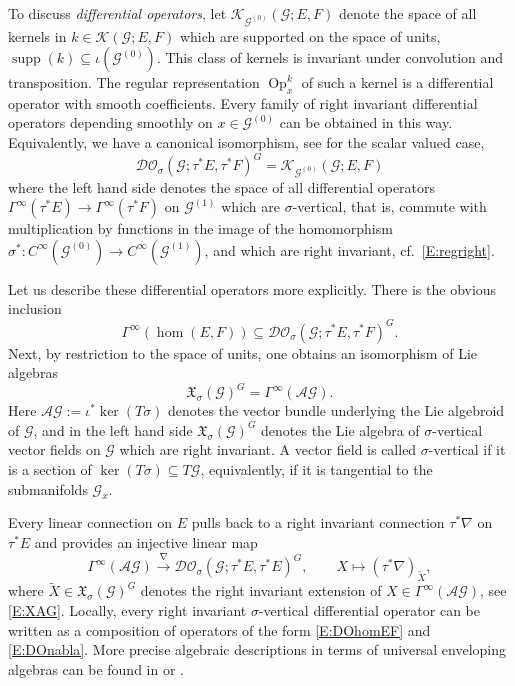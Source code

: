 \documentclass[reqno,12pt]{amsart}
\DeclareMathOperator{\Op}{Op}
\DeclareMathOperator{\supp}{supp}
\newcommand{\DO}{\mathcal D\mathcal O}
\theoremstyle{plain}
\theoremstyle{definition}
\begin{document}
To discuss \emph{differential operators}, let $\mathcal K_{\mathcal G^{(0)}}(\mathcal G;E,F)$ denote the space of all kernels in $k\in\mathcal K(\mathcal G;E,F)$ which are supported on the space of units, $\supp(k)\subseteq\iota(\mathcal G^{(0)})$.
This class of kernels is invariant under convolution and transposition.
The regular representation $\Op^k_x$ of such a kernel is a differential operator with smooth coefficients.
Every family of right invariant differential operators depending smoothly on $x\in\mathcal G^{(0)}$ can be obtained in this way.
Equivalently, we have a canonical isomorphism, see \cite[Proposition~84]{EY15} for the scalar valued case,
\begin{equation}\label{E:DOG}
\DO_\sigma(\mathcal G;\tau^*E,\tau^*F)^G
=\mathcal K_{\mathcal G^{(0)}}(\mathcal G;E,F)
\end{equation}
where the left hand side denotes the space of all differential operators $\Gamma^\infty(\tau^*E)\to\Gamma^\infty(\tau^*F)$ on $\mathcal G^{(1)}$ which are $\sigma$-vertical, that is, commute with multiplication by functions in the image of the homomorphism $\sigma^*\colon C^\infty(\mathcal G^{(0)})\to C^\infty(\mathcal G^{(1)})$, and which are right invariant, cf.~\eqref{E:regright}.


Let us describe these differential operators more explicitly. 
There is the obvious inclusion 
\begin{equation}\label{E:DOhomEF}
\Gamma^\infty(\hom(E,F))\subseteq\DO_\sigma(\mathcal G;\tau^*E,\tau^*F)^G.
\end{equation}
Next, by restriction to the space of units, one obtains an isomorphism of Lie algebras
\begin{equation}\label{E:XAG}
\mathfrak X_\sigma(\mathcal G)^G=\Gamma^\infty(\mathcal A\mathcal G).
\end{equation}
Here $\mathcal A\mathcal G:=\iota^*\ker(T\sigma)$ denotes the vector bundle underlying the Lie algebroid of $\mathcal G$, and in the left hand side  $\mathfrak X_\sigma(\mathcal G)^G$ denotes the Lie algebra of $\sigma$-vertical vector fields on $\mathcal G$ which are right invariant.
A vector field is called $\sigma$-vertical if it is a section of $\ker(T\sigma)\subseteq T\mathcal G$, equivalently, if it is tangential to the submanifolds $\mathcal G_x$.


Every linear connection on $E$ pulls back to a right invariant connection $\tau^*\nabla$ on $\tau^*E$ and provides an injective linear map
\begin{equation}\label{E:DOnabla}
\Gamma^\infty(\mathcal A\mathcal G)\xrightarrow\nabla\DO_\sigma(\mathcal G;\tau^*E,\tau^*E)^G,\qquad X\mapsto(\tau^*\nabla)_{\tilde X},
\end{equation}
where $\tilde X\in\mathfrak X_\sigma(\mathcal G)^G$ denotes the right invariant extension of $X\in\Gamma^\infty(\mathcal A\mathcal G)$, see \eqref{E:XAG}.
Locally, every right invariant $\sigma$-vertical differential operator can be written as a composition of operators of the form \eqref{E:DOhomEF} and \eqref{E:DOnabla}.
More precise algebraic descriptions in terms of universal enveloping algebras can be found in \cite[Theorem~3]{NWX99} or \cite[Section~7.1]{EY15}.
\end{document}
